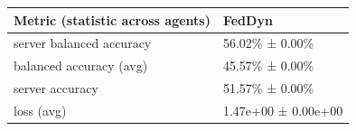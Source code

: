 \begin{tabular}{ll}
\hline
 Metric (statistic across agents)   & FedDyn              \\
\hline
 server balanced accuracy           & 56.02\% ± 0.00\%      \\
 balanced accuracy (avg)            & 45.57\% ± 0.00\%      \\
 server accuracy                    & 51.57\% ± 0.00\%      \\
 loss (avg)                         & 1.47e+00 ± 0.00e+00 \\
\hline
\end{tabular}